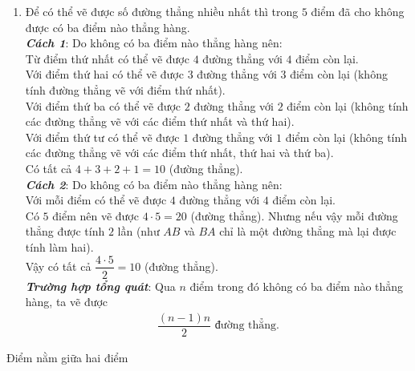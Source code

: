 \begin{vd}
{\begin{enumerate}
			Trường hợp chỉ có 3 điểm thẳng hàng, ta vẽ được $4$ đường thẳng.\\
			Trường hợp không có ba điểm nào thẳng hàng, ta vẽ được $6$ đường thẳng.
			\item Để có thể vẽ được số đường thẳng nhiều nhất thì trong $5$ điểm đã cho không được có ba điểm nào thẳng hàng.\\
			\textbf{\textit{Cách 1}}: Do không có ba điểm nào thẳng hàng nên:\\
			Từ điểm thứ nhất có thể vẽ được $4$ đường thẳng với $4$ điểm còn lại.\\
			Với điểm thứ hai có thể vẽ được $3$ đường thẳng với $3$ điểm còn lại (không tính đường thẳng vẽ với điểm thứ nhất).\\
			Với điểm thứ ba có thể vẽ được $2$ đường thẳng với $2$ điểm còn lại (không tính các đường thẳng vẽ với các điểm thứ nhất và thứ hai).\\
			Với điểm thứ tư có thể vẽ được $1$ đường thẳng với $1$ điểm còn lại (không tính các đường thẳng vẽ với các điểm thứ nhất, thứ hai và thứ ba).\\
			Có tất cả $4+3+2+1=10$ (đường thẳng).\\
			\textbf{\textit{Cách 2}}: Do không có ba điểm nào thẳng hàng nên:\\
			Với mỗi điểm có thể vẽ được $4$ đường thẳng với $4$ điểm còn lại.\\
			Có $5$ điểm nên vẽ được $4\cdot 5=20$ (đường thẳng). Nhưng nếu vậy mỗi đường thẳng được tính $2$ lần (như $AB$ và $BA$ chỉ là một đường thẳng mà lại được tính làm hai).\\
			Vậy có tất cả $\dfrac{4\cdot 5}{2}=10$ (đường thẳng).\\
			\textbf{\textit{Trường hợp tổng quát}}: Qua $n$ điểm trong đó không có ba điểm nào thẳng hàng, ta vẽ được
			\begin{align*}
				\dfrac{(n-1)n}{2} \text{ đường thẳng}.
			\end{align*}
		\end{enumerate}
	}
\end{vd}

\begin{dang}{Điểm nằm giữa hai điểm}
	
\end{dang}


